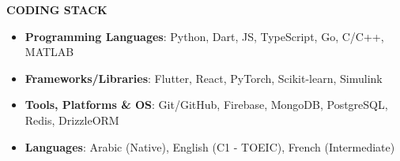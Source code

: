 \documentclass[10pt,a4paper]{article}
\newcommand{\cvsection}[1]{%
  \vspace{1em}%
  {\centering\textcolor{sectcol}{\textbf{#1}}\par}%
  \vspace{0.2em}%
}
\begin{document}
\vspace{-12px}
\cvsection{CODING STACK}
\begin{itemize}[noitemsep, topsep=0pt, left=3pt]
    \item  \textbf{Programming Languages}: Python, Dart, JS, TypeScript, Go, C/C++, MATLAB
    \item  \textbf{Frameworks/Libraries}: Flutter, React, PyTorch, Scikit-learn, Simulink
    \item  \textbf{Tools, Platforms \& OS}: Git/GitHub, Firebase, MongoDB, PostgreSQL, Redis, DrizzleORM
    \item  \textbf{Languages}: Arabic (Native), English (C1 - TOEIC), French (Intermediate)

\end{itemize}
\end{document}
